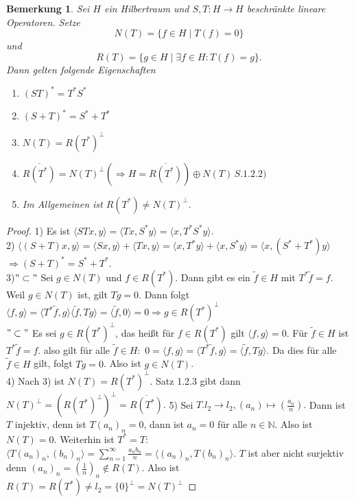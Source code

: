 \documentclass[12pt,titlepage]{article}
\newtheorem{bemerkung}[zahl]{Bemerkung}
\numberwithin{equation}{section}
\begin{document}
\begin{bemerkung}
Sei $H$ ein Hilbertraum und $S,T:H \to H$ beschränkte lineare Operatoren. Setze 
\[
N(T)=\{f \in H \mid T(f)=0\}
\] und 
\[
R(T)=\{g \in H \mid \exists f \in H : T(f)=g\}.
\]
Dann gelten folgende Eigenschaften
\begin{enumerate}
\item $(ST)^*=T^*S^*$
\item $(S+T)^*=S^*+T^*$
\item $N(T)=R(T^*)^{\perp}$
\item $\overline{R(T^*)}=N(T)^{\perp}(\Rightarrow H=\overline{R(T^*)})\oplus N(T) \, S.1.2.2)$
\item Im Allgemeinen ist $R(T^*)\neq N(T)^{\perp}.$
\end{enumerate}
\end{bemerkung}
\begin{proof}
1) Es ist $\langle STx,y \rangle=\langle Tx,S^*y \rangle=\langle x,T^*S^* y \rangle$.\\
2) $\langle (S+T)x ,y \rangle= \langle Sx ,y \rangle+\langle Tx,y \rangle=\langle x,T^*y \rangle+\langle x,S^*y \rangle=\langle x,(S^*+T^*)y \rangle$ $\Rightarrow (S+T)^*=S^*+T^*.$\\
3)$"\subset"$ Sei $g \in N(T)$ und $f\in R(T^*).$ Dann gibt es ein $\tilde{f}\in H$ mit $T^*\tilde{f}=f$. Weil $g \in N(T)$ ist, gilt $Tg=0.$ Dann folgt $\langle f,g \rangle=\langle T^* \tilde{f},g \rangle\langle \tilde{f},Tg \rangle=\langle \tilde{f},0 \rangle=0\Rightarrow g \in R(T^*)^{\perp}$\\
$"\subset"$ Es sei $g \in R(T^*)^{\perp}$, das heißt für $f \in R(T^*)$ gilt $\langle f,g \rangle=0.$ Für $\tilde{f}\in H$ ist $T^*\tilde{f}=f.$ also gilt für alle $\tilde{f}\in H:$
$0=\langle f,g \rangle=\langle T^*\tilde{f},g \rangle=\langle \tilde{f}, Tg \rangle.$ Da dies für alle $\tilde{f} \in H$ gilt, folgt $Tg=0$. Also ist $g \in N(T)$.\\
4) Nach 3) ist $N(T)=R(T^*)^{\perp}$. Satz 1.2.3 gibt dann $N(T)^{\perp}=(R(T^*)^{\perp})^{\perp}=\overline{R(T^*)}.$ 
5) Sei $T.l_2 \to l_2, (a_n) \mapsto (\frac{a_n}{n}).$ Dann ist $T$ injektiv, denn ist $T(a_n)_n=0$, dann ist $a_n=0$ für alle $n\in \mathbb{N}.$ Also ist $N(T)=0.$ Weiterhin ist $T^*=T:$\\
$\langle T(a_n)_n,(b_n)_n \rangle=\sum_{n=1}^{\infty}\frac{a_nb_n}{n}=\langle (a_n)_n,T(b_n)_n \rangle. $ $T$ ist aber nicht surjektiv denn $(a_n)_n=(\frac{1}{n})_n \notin R(T).$ Also ist $R(T)=R(T^*) \neq l_2 =\{0\}^{\perp}=N(T)^{\perp}$
\end{proof}
\end{document}
